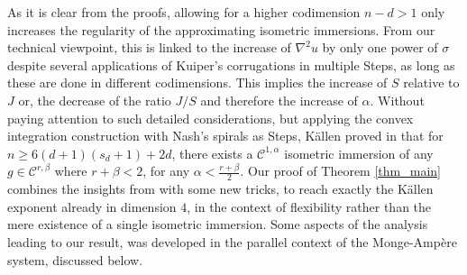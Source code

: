 \documentclass[reqno,twoside,11pt]{amsart}
\numberwithin{equation}{section}
\theoremstyle{plain}
\theoremstyle{definition}
\begin{document}
As it is clear from the proofs, allowing for a higher codimension
$n-d>1$ only increases the regularity of the approximating
isometric immersions. From our technical viewpoint, this is linked to 
the increase of $\nabla^2u$ by only one power of $\sigma$ despite
several applications of Kuiper's corrugations in multiple Steps, as long as these
are done in different codimensions. This implies the increase of $S$
relative to $J$ or, the decrease of the ratio $J/S$ and therefore the increase
of $\alpha$. Without paying attention to such detailed considerations,
but applying the convex integration construction with Nash's spirals
as Steps, K\"allen proved in \cite{Kallen} that for $n\geq 6(d+1)(s_d+1)+2d$, 
there exists a $\mathcal{C}^{1,\alpha}$ isometric immersion of any
$g\in\mathcal{C}^{r,\beta}$ where $r+\beta<2$, for any
$\alpha<\frac{r+\beta}{2}$. Our proof of Theorem \ref{thm_main}
combines the insights from \cite{Kallen, CHI2, CDS}
with some new tricks, to reach exactly the K\"allen exponent already
in dimension $4$, in the context of flexibility rather than the mere
existence of a single isometric immersion. Some aspects of the analysis leading to our
result, was developed in the parallel context of the Monge-Amp\`ere system,
discussed below.

\medskip
\end{document}
